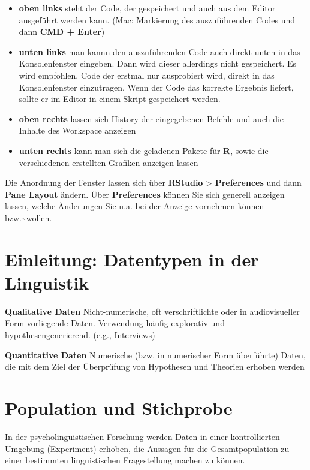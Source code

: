\documentclass[]{book}
\providecommand{\tightlist}{%
  \setlength{\itemsep}{0pt}\setlength{\parskip}{0pt}}
\begin{document}
\begin{itemize}
\tightlist
\item
  \textbf{oben links} steht der Code, der gespeichert und auch aus dem
  Editor ausgeführt werden kann. (Mac: Markierung des auszuführenden
  Codes und dann \textbf{CMD + Enter})
\item
  \textbf{unten links} man kannn den auszuführenden Code auch direkt
  unten in das Konsolenfenster eingeben. Dann wird dieser allerdings
  nicht gespeichert. Es wird empfohlen, Code der erstmal nur ausprobiert
  wird, direkt in das Konsolenfenster einzutragen. Wenn der Code das
  korrekte Ergebnis liefert, sollte er im Editor in einem Skript
  gespeichert werden.
\item
  \textbf{oben rechts} lassen sich History der eingegebenen Befehle und
  auch die Inhalte des Workspace anzeigen
\item
  \textbf{unten rechts} kann man sich die geladenen Pakete für
  \textbf{R}, sowie die verschiedenen erstellten Grafiken anzeigen
  lassen
\end{itemize}

Die Anordnung der Fenster lassen sich über \textbf{RStudio}
\textgreater{} \textbf{Preferences} und dann \textbf{Pane Layout}
ändern. Über \textbf{Preferences} können Sie sich generell anzeigen
lassen, welche Änderungen Sie u.a. bei der Anzeige vornehmen können
bzw.\textasciitilde{}wollen.

\section{Einleitung: Datentypen in der
Linguistik}\label{einleitung-datentypen-in-der-linguistik}

\textbf{Qualitative Daten} Nicht-numerische, oft verschriftlichte oder
in audiovisueller Form vorliegende Daten. Verwendung häufig explorativ
und hypothesengenerierend. (e.g., Interviews)

\textbf{Quantitative Daten} Numerische (bzw. in numerischer Form
überführte) Daten, die mit dem Ziel der Überprüfung von Hypothesen und
Theorien erhoben werden

\section{Population und Stichprobe}\label{population-und-stichprobe}

In der psycholinguistischen Forschung werden Daten in einer
kontrollierten Umgebung (Experiment) erhoben, die Aussagen für die
Gesamtpopulation zu einer bestimmten linguistischen Fragestellung machen
zu können.
\end{document}
